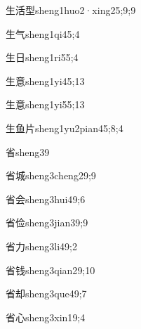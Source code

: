 \begin{verbete}{生活型}{sheng1huo2·xing2}{5;9;9}
\end{verbete}
\begin{verbete}{生气}{sheng1qi4}{5;4}
\end{verbete}
\begin{verbete}{生日}{sheng1ri5}{5;4}
\end{verbete}
\begin{verbete}{生意}{sheng1yi4}{5;13}
\end{verbete}
\begin{verbete}{生意}{sheng1yi5}{5;13}
\end{verbete}
\begin{verbete}{生鱼片}{sheng1yu2pian4}{5;8;4}
\end{verbete}
\begin{verbete}{省}{sheng3}{9}
\end{verbete}
\begin{verbete}{省城}{sheng3cheng2}{9;9}
\end{verbete}
\begin{verbete}{省会}{sheng3hui4}{9;6}
\end{verbete}
\begin{verbete}{省俭}{sheng3jian3}{9;9}
\end{verbete}
\begin{verbete}{省力}{sheng3li4}{9;2}
\end{verbete}
\begin{verbete}{省钱}{sheng3qian2}{9;10}
\end{verbete}
\begin{verbete}{省却}{sheng3que4}{9;7}
\end{verbete}
\begin{verbete}{省心}{sheng3xin1}{9;4}
\end{verbete}
